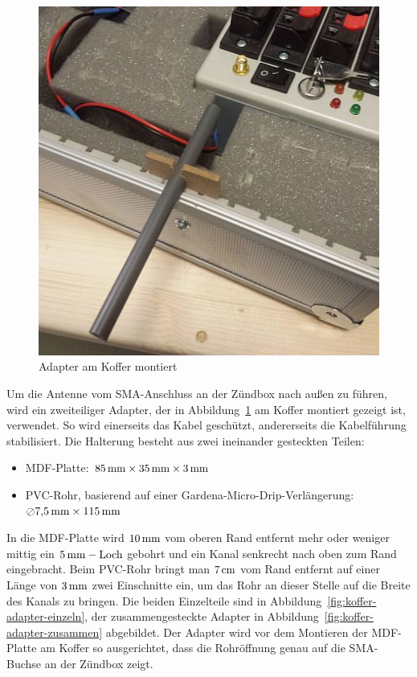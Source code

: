 \documentclass[pdftex, parskip, numbers=noenddot, toc=listof]{scrbook}
\begin{document}
	\begin{figure}
		\centering
		\includegraphics[width=.75\textwidth]{Bilder/koffer-adapter-montiert}
		\caption{Adapter am Koffer montiert}
		\label{fig:koffer-adapter-montiert}
	\end{figure}

	Um die Antenne vom SMA-Anschluss an der Zündbox nach außen zu führen, wird ein zweiteiliger Adapter, der in Abbildung~\ref{fig:koffer-adapter-montiert} am Koffer montiert gezeigt ist, verwendet. So wird einerseits das Kabel geschützt, andererseits die Kabelführung stabilisiert. Die Halterung besteht aus zwei ineinander gesteckten Teilen:
	\begin{itemize}
		\item MDF-Platte: $\unit[85]{mm} \times \unit[35]{mm} \times \unit[3]{mm}$
		\item PVC-Rohr, basierend auf einer Gardena-Micro-Drip-Verlängerung: $\oslash\unit[7{,}5]{mm} \times \unit[115]{mm}$
	\end{itemize}

	In die MDF-Platte wird $\unit[10]{mm}$ vom oberen Rand entfernt mehr oder weniger mittig ein $\unit[5]{mm}-\text{Loch}$ gebohrt und ein Kanal senkrecht nach oben zum Rand eingebracht. Beim PVC-Rohr bringt man $\unit[7]{cm}$ vom Rand entfernt auf einer Länge von $\unit[3]{mm}$ zwei Einschnitte ein, um das Rohr an dieser Stelle auf die Breite des Kanals zu bringen. Die beiden Einzelteile sind in Abbildung~\ref{fig:koffer-adapter-einzeln}, der zusammengesteckte Adapter in Abbildung~\ref{fig:koffer-adapter-zusammen} abgebildet. Der Adapter wird vor dem Montieren der MDF-Platte am Koffer so ausgerichtet, dass die Rohröffnung genau auf die SMA-Buchse an der Zündbox zeigt.
\end{document}
